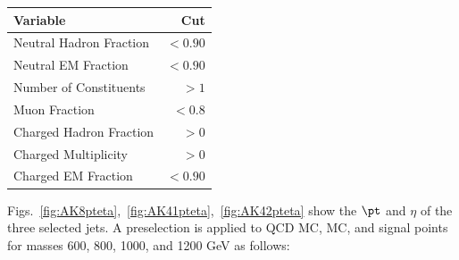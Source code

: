 \begin{table}[htb]
  \begin{center}
    \begin{tabular}{l r}
    \hline
    \hline
    Variable &  Cut \\
    \hline
    Neutral Hadron Fraction & $<0.90$  \\
    Neutral EM Fraction     & $<0.90$  \\
    Number of Constituents  & $>1$     \\
    Muon Fraction           & $<0.8$   \\
    Charged Hadron Fraction & $>0$     \\
    Charged Multiplicity    & $>0$     \\
    Charged EM Fraction     & $< 0.90$ \\
    \hline
    \hline
    \end{tabular}
  \end{center}
\end{table}

Figs.~\ref{fig:AK8pteta},~\ref{fig:AK41pteta},~\ref{fig:AK42pteta} show the $\pt$ and $\eta$ of the three selected jets. A preselection is applied to QCD MC, \ttbar MC, and signal points for masses 600, 800, 1000, and 1200 GeV as follows:

